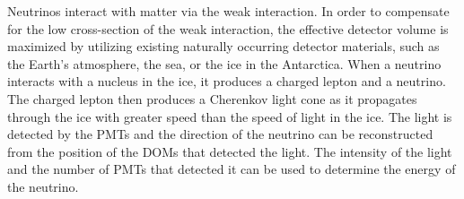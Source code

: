 Neutrinos interact with matter via the weak interaction.
In order to compensate for the low cross-section of the weak interaction,
  the effective detector volume is maximized by utilizing existing naturally occurring detector materials,
  such as
    the Earth's atmosphere,
    the sea,
    or the ice in the Antarctica.
%
When a neutrino interacts with a nucleus in the ice,
it produces a charged lepton and a neutrino.
The charged lepton then produces a Cherenkov light cone
  as it propagates through the ice
    with greater speed than the speed of light in the ice.
The light is detected by the \acp{PMT}
  and the direction of the neutrino can be reconstructed
    from the position of the \acp{DOM}
      that detected the light.
The intensity of the light and the number of \acp{PMT} that detected it
  can be used to determine the energy of the neutrino.

